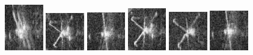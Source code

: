 \begin{figure}
    \includegraphics[width=0.15\textwidth]{chapters/images/dataset/all-class-images/valve/valve-22.jpg}
    \includegraphics[width=0.15\textwidth]{chapters/images/dataset/all-class-images/valve/valve-56.jpg}
    \includegraphics[width=0.15\textwidth]{chapters/images/dataset/all-class-images/valve/valve-5.jpg}
    \includegraphics[width=0.15\textwidth]{chapters/images/dataset/all-class-images/valve/valve-71.jpg}
    \includegraphics[width=0.15\textwidth]{chapters/images/dataset/all-class-images/valve/valve-194.jpg}
    \includegraphics[width=0.15\textwidth]{chapters/images/dataset/all-class-images/valve/valve-8.jpg}
    

\end{figure}
